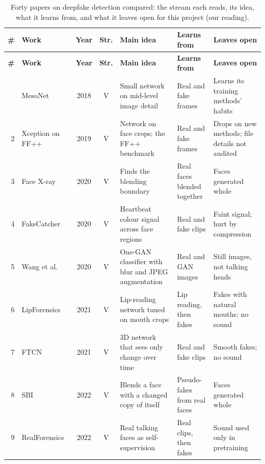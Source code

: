 {\footnotesize
\setlength{\tabcolsep}{3pt}
\begin{longtable}{@{}r >{\raggedright\arraybackslash}p{2.5cm} c c >{\raggedright\arraybackslash}p{3.9cm} >{\raggedright\arraybackslash}p{2.5cm} >{\raggedright\arraybackslash}p{3.5cm}@{}}
    \caption{Forty papers on deepfake detection compared: the stream each reads, its idea, what it learns from, and what it leaves open for this project (our reading).}
    \label{tab:forty} \\
    \toprule
    \textbf{\#} & \textbf{Work} & \textbf{Year} & \textbf{Str.} & \textbf{Main idea} & \textbf{Learns from} & \textbf{Leaves open} \\
    \midrule
    \endfirsthead
    \toprule
    \textbf{\#} & \textbf{Work} & \textbf{Year} & \textbf{Str.} & \textbf{Main idea} & \textbf{Learns from} & \textbf{Leaves open} \\
    \midrule
    \endhead
    \bottomrule
    \endfoot
        1 & MesoNet~\cite{mesonet} & 2018 & V & Small network on mid-level image detail & Real and fake frames & Learns its training methods' habits \\
        2 & Xception on FF++~\cite{ffpp} & 2019 & V & Network on face crops; the FF++ benchmark & Real and fake frames & Drops on new methods; file details not audited \\
        3 & Face X-ray~\cite{facexray} & 2020 & V & Finds the blending boundary & Real faces blended together & Faces generated whole \\
        4 & FakeCatcher~\cite{fakecatcher} & 2020 & V & Heartbeat colour signal across face regions & Real and fake clips & Faint signal; hurt by compression \\
        5 & Wang et al.~\cite{cnnspot} & 2020 & V & One-GAN classifier with blur and JPEG augmentation & Real and GAN images & Still images, not talking heads \\
        6 & LipForensics~\cite{lipforensics} & 2021 & V & Lip-reading network tuned on mouth crops & Lip reading, then fakes & Fakes with natural mouths; no sound \\
        7 & FTCN~\cite{ftcn} & 2021 & V & 3D network that sees only change over time & Real and fake clips & Smooth fakes; no sound \\
        8 & SBI~\cite{sbi} & 2022 & V & Blends a face with a changed copy of itself & Pseudo-fakes from real faces & Faces generated whole \\
        9 & RealForensics~\cite{realforensics} & 2022 & V & Real talking faces as self-supervision & Real clips, then fakes & Sound used only in pretraining \\

\end{longtable}}
